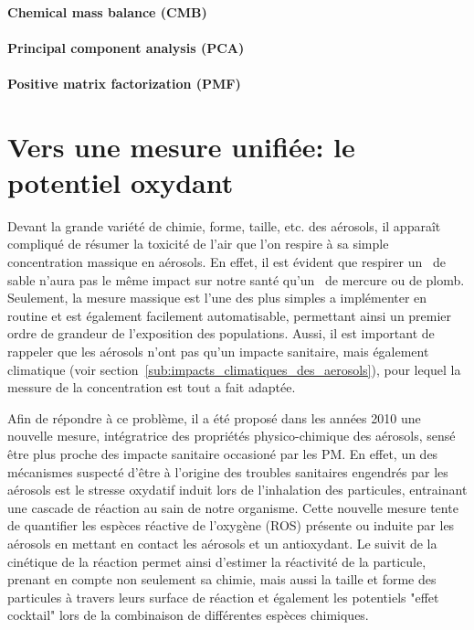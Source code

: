 \paragraph{Chemical mass balance (CMB)}%
\label{sub:chemical_mass_balance_cmb_}

\paragraph{Principal component analysis (PCA)}%
\label{sub:principal_component_analysis_pca_}

\paragraph{Positive matrix factorization (PMF)}%
\label{sub:positive_matrix_factorization_pmf_}


\section{Vers une mesure unifiée: le potentiel oxydant}%
\label{sec:le_potentiel_oxydant_des_aerosols}

Devant la grande variété de chimie, forme, taille, etc. des aérosols, il apparaît
compliqué de résumer la toxicité de l'air que l'on respire à sa simple concentration
massique en aérosols. En effet, il est évident que respirer un~\ugm{} de sable n'aura pas
le même impact sur notre santé qu'un~\ugm{} de mercure ou de plomb.
Seulement, la mesure massique est l'une des plus simples a implémenter en routine et est
également facilement automatisable, permettant ainsi un premier ordre de grandeur de 
l'exposition des populations. Aussi, il est important de rappeler que les aérosols n'ont
pas qu'un impacte sanitaire, mais également climatique (voir
section~\ref{sub:impacts_climatiques_des_aerosols}), pour lequel la messure de la concentration est tout a
fait adaptée.

Afin de répondre à ce problème, il a été proposé dans les années 2010 une nouvelle mesure,
intégratrice des propriétés physico-chimique des aérosols, sensé être plus proche des
impacte sanitaire occasioné par les PM. En effet, un des mécanismes suspecté d'être à
l'origine des troubles sanitaires engendrés par les aérosols est le stresse oxydatif
induit lors de l'inhalation des particules, entrainant une cascade de réaction au sain de
notre organisme.
Cette nouvelle mesure tente de quantifier les espèces réactive de l'oxygène (ROS) présente
ou induite par les aérosols en mettant en contact les aérosols et un antioxydant.
Le suivit de la cinétique de la réaction permet ainsi d'estimer la réactivité de la
particule, prenant en compte non seulement sa chimie, mais aussi la taille et forme des
particules à travers leurs surface de réaction et également les potentiels "effet
cocktail" lors de la combinaison de différentes espèces chimiques.

